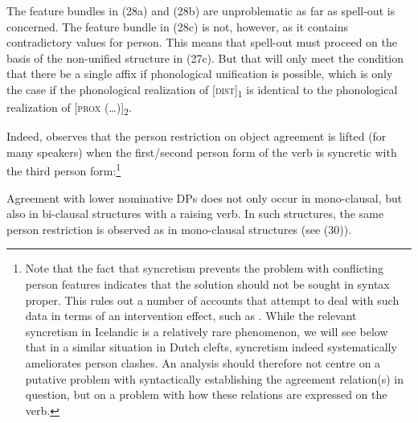 \documentclass[output=paper]{langsci/langscibook}
\begin{document}
The feature bundles in (28a) and (28b) are unproblematic as far as spell-out is concerned. The feature bundle in (28c) is not, however, as it contains contradictory values for person. This means that spell-out must proceed on the basis of the non-unified structure in (27c). But that will only meet the condition that there be a single affix if phonological unification is possible, which is only the case if the phonological realization of [\textsc{dist}]\textsubscript{1} is identical to the phonological realization of [\textsc{prox} (…)]\textsubscript{2}.

Indeed, \citet{Sigurðsson1996} observes that the person restriction on object agreement is lifted (for many speakers) when the first\slash second person form of the verb is syncretic with the third person form:\footnote{Note that the fact that syncretism prevents the problem with conflicting person features indicates that the solution should not be sought in syntax proper. This rules out a number of accounts that attempt to deal with such data in terms of an intervention effect, such as \citealt{Sigurðsson2008}. While the relevant syncretism in Icelandic is a relatively rare phenomenon, we will see below that in a similar situation in Dutch clefts, syncretism indeed systematically ameliorates person clashes. An analysis should therefore not centre on a putative problem with syntactically establishing the agreement relation(s) in question, but on a problem with how these relations are expressed on the verb.}

\ea \judgewidth{\%} 
\z \z

Agreement with lower nominative DPs does not only occur in mono-clausal, but also in bi-clausal structures with a raising verb. In such structures, the same person restriction is observed as in mono-clausal structures (see (30)). 
\end{document}
